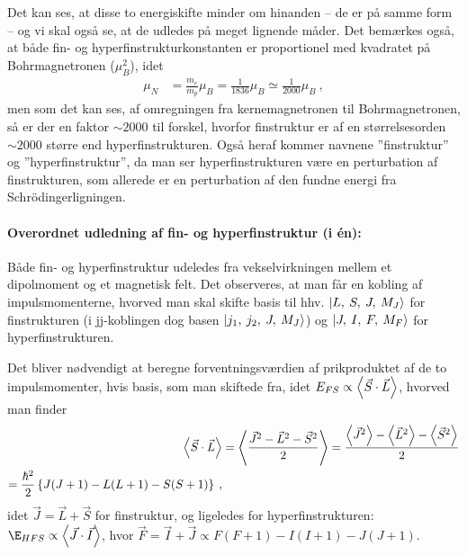 Det kan ses, at disse to energiskifte minder om hinanden -- de er på samme form -- og vi skal også se, at de udledes på meget lignende måder. Det bemærkes også, at både fin- og hyperfinstrukturkonstanten er proportionel med kvadratet på Bohrmagnetronen ($\mu_B^2$), idet
\begin{align}
    \mu_N &= \frac{m_e}{m_p} \mu_B = \frac{1}{1836}\mu_B \simeq \frac{1}{2000}\mu_B \: ,
\end{align}
men som det kan ses, af omregningen fra kernemagnetronen til Bohrmagnetronen, så er der en faktor $\sim 2000$ til forskel, hvorfor finstruktur er af en størrelsesorden $\sim 2000$ større end hyperfinstrukturen. Også heraf kommer navnene ''finstruktur'' og ''hyperfinstruktur'', da man ser hyperfinstrukturen være en perturbation af finstrukturen, som allerede er en perturbation af den fundne energi fra Schrödingerligningen.\\


\paragraph{Overordnet udledning af fin- og hyperfinstruktur (i én):} Både fin- og hyperfinstruktur udeledes fra vekselvirkningen mellem et dipolmoment og et magnetisk felt. Det observeres, at man får en kobling af impulsmomenterne, hvorved man skal skifte basis til hhv. $\ket{L,\: S,\: J,\: M_J}$ for finstrukturen (i jj-koblingen dog basen $\ket{j_1,\: j_2,\: J,\: M_J}$) og $\ket{J,\: I,\: F,\: M_F}$ for hyperfinstrukturen.

Det bliver nødvendigt at beregne forventningsværdien af prikproduktet af de to impulsmomenter, hvis basis, som man skiftede fra, idet $E_{FS} \propto \Braket{\Vec{S} \cdot \Vec{L}}$, hvorved man finder
\begin{align}
    \Braket{\Vec{S} \cdot \Vec{L}} &= \Braket{\frac{\Vec{J}^2 - \Vec{L}^2 - \Vec{S}^2}{2}}
    = \frac{\Braket{\Vec{J}^2} - \Braket{\Vec{L}^2} - \Braket{\Vec{S}^2}}{2} \nonumber\\
    = \frac{\hbar^2}{2}\left\{J(J+1) - L(L+1) - S(S+1)\right\} \: ,
\end{align}
idet $\Vec{J} = \Vec{L} + \Vec{S}$ for finstruktur, og ligeledes for hyperfinstrukturen: $\E_{HFS} \propto \braket{\Vec{J} \cdot \Vec{I}}$, hvor $\Vec{F} = \Vec{I} + \Vec{J} \propto F(F+1) - I(I+1) - J(J+1)$.